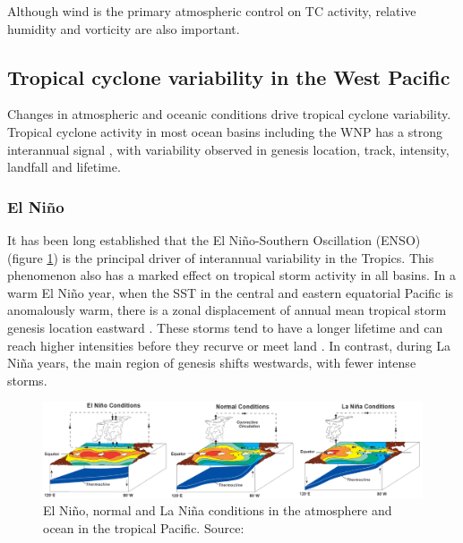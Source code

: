Although wind is the primary atmospheric control on TC activity, relative humidity and vorticity are also important.


\subsection{Tropical cyclone variability in the West Pacific}

Changes in atmospheric and oceanic conditions drive tropical cyclone variability. Tropical cyclone activity in most ocean basins including the WNP has a strong interannual signal \citep{landsea2000climate}, with variability observed in genesis location, track, intensity, landfall and lifetime.%



\subsubsection{El Ni\~{n}o}

It has been long established that the El Ni\~{n}o-Southern Oscillation (ENSO) (figure \ref{fig:nino}) is the principal driver of interannual variability in the Tropics. This phenomenon also has a marked effect on tropical storm activity in all basins. In a warm El Ni\~{n}o year, when the SST in the central and eastern equatorial Pacific is anomalously warm, there is a zonal displacement of annual mean tropical storm genesis location eastward \citep{lander1994exploratory, zhan2011contributions}. These storms tend to have a longer lifetime and can reach higher intensities before they recurve or meet land \citep{camargo2007cluster, chan1998seasonal}. In contrast, during La Ni\~{n}a years, the main region of genesis shifts westwards, with fewer intense storms.


\begin{figure}[h]
	\centering
	\noindent\includegraphics[width=40pc,angle=0]{Stressors_ENSO3.png}
	\caption{El Ni\~{n}o, normal and La Ni\~{n}a conditions in the atmosphere and ocean in the tropical Pacific. Source: \cite{noaa_enso}}\label{fig:nino}
\end{figure}


